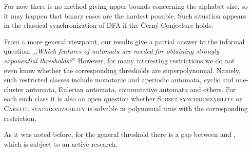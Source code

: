 \documentclass{ws-ijmpc}
\newcommand{\noun}[1]{\textsc{#1}}
\begin{document}
For now there is no method giving upper bounds concerning the alphabet
size, so it may happen that binary cases are the hardest possible.
Such situation appears in the classical synchronization of DFA if
the \v{C}ern\'{y} Conjecture holds. 

From a more general viewpoint, our results give a partial answer to
the informal question: \emph{,,Which features of automata are needed
for obtaining strongly exponential thresholds?}'' However, for many
interesting restrictions we do not even know whether the corresponding
thresholds are superpolynomial. Namely, such restricted classes include
monotonic and aperiodic automata, cyclic and one-cluster automata,
Eulerian automata, commutative automata and others. For each such
class it is also an open question whether \noun{Subset synchronizability
}or \noun{Careful synchronizability }is solvable in polynomial time
with the corresponding restriction.

As it was noted before, for the general threshold 
there is a gap between 
and , which is subject to an
active research.



\end{document}
